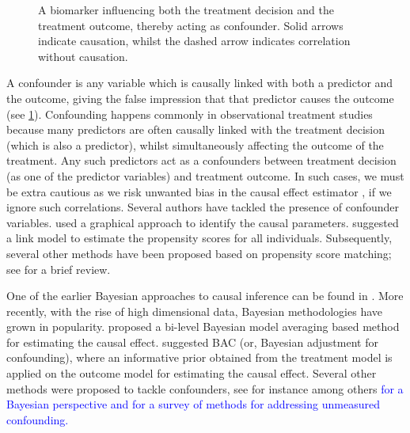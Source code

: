 \documentclass[preprint,12pt]{elsarticle}
\newcommand{\added}[1]{\textcolor{blue}{#1}}
\begin{document}
\begin{figure}[h]
\begin{center}
\end{center}
\caption{A biomarker influencing both the treatment decision and the treatment outcome, thereby acting as confounder. Solid arrows indicate causation, whilst the dashed arrow indicates correlation without causation.}
\label{fig:confounding}
\end{figure}
A confounder is any variable which is causally linked with both a predictor and the outcome, giving the false impression that that predictor causes the outcome (see \cref{fig:confounding}).
Confounding happens commonly in observational treatment studies because many predictors are often causally linked with the treatment decision (which is also a predictor), whilst simultaneously affecting the outcome of the treatment. Any such predictors act as a confounders between treatment decision (as one of the predictor variables) and treatment outcome.
In such cases, we must be extra cautious as we risk
unwanted bias in the causal effect estimator \citep{rosenbaum83},
if we ignore such correlations.
Several authors have tackled the presence of
confounder variables. 
 used a graphical
approach to identify the causal parameters.
 suggested a link model to estimate
the propensity scores for all individuals. Subsequently, several other
methods have been proposed based on propensity score matching;
see \citep{winship99,stuart10} for a brief review.

One of the earlier Bayesian approaches to causal inference
can be found in \citep{rubin1978}. More recently,
with the rise of high dimensional data,
Bayesian methodologies have grown in popularity.
 proposed a bi-level 
Bayesian model averaging based method for estimating the causal 
effect.  suggested BAC (or, Bayesian adjustment for
confounding),
where an informative prior obtained from
the treatment model is applied on the outcome model for
estimating the causal effect. Several other methods were
proposed to tackle confounders,
see for instance \citep{Zigler2014,Hahn2018} among others \added{for
	a Bayesian perspective and
	\citep{zhang_2018} for a survey of methods for addressing unmeasured confounding.}
\end{document}
